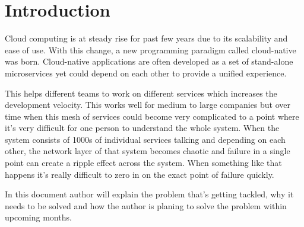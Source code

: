 \chapter{Introduction}

Cloud computing is at steady rise for past few years  due to its scalability and  ease of use. With this change, a new programming paradigm called cloud-native was born. Cloud-native applications are often developed as a set of stand-alone microservices \citep{dragoni2017microservices} yet could depend on each other to provide a unified experience. 

This helps different teams to work on different services which increases the development velocity. This works well for medium to large companies but over time when this mesh of services could become very complicated to a point where it's very difficult for one person to understand the whole system. When the system consists of 1000s of individual services talking and depending on each other, the network layer of that system becomes chaotic \citep{Introduc54:online} and failure in a single point can create a ripple effect across the system. When something like that happens it's really difficult to zero in on the exact point of failure quickly. 

In this document author will explain the problem that's getting tackled, why it needs to be solved and how the author is planing to solve the problem within upcoming months.

